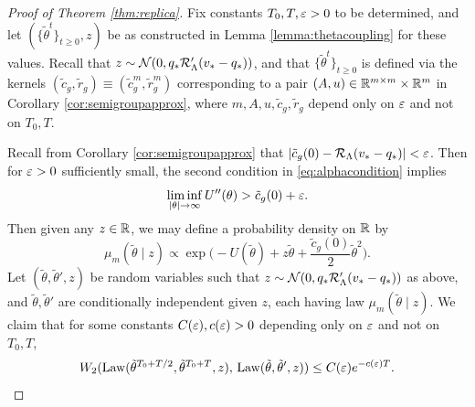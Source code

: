 \begin{proof}[Proof of Theorem \ref{thm:replica}]


Fix constants $T_0,T,\varepsilon>0$ to be determined, and let
$(\{\tilde \theta^t\}_{t \geq 0},z)$
be as constructed in Lemma \ref{lemma:thetacoupling} for these values.
Recall that $z \sim \mathcal{N}(0,q_*\mathcal{R}_\Lambda'(v_*-q_*))$, and that
 $\{\tilde \theta^t\}_{t \geq 0}$ is defined via the kernels
$(\tilde c_g,\tilde r_g) \equiv (\tilde c_g^m,\tilde r_g^m)$
corresponding to a pair $(A,u) \in \mathbb{R}^{m \times m} \times
\mathbb{R}^m$ in Corollary \ref{cor:semigroupapprox},
where $m,A,u,\tilde c_g,\tilde r_g$ depend only on $\varepsilon$ and not on $T_0,T$.

Recall from Corollary \ref{cor:semigroupapprox} that
$|\tilde c_g(0)-\mathcal{R}_\Lambda(v_*-q_*)|<\varepsilon$.
Then for $\varepsilon>0$ sufficiently small, the second condition in
\eqref{eq:alphacondition} implies
\begin{equation}\label{eq:Uconvexityreplica}
\liminf_{|\theta| \to \infty} U''(\theta)>\tilde c_g(0)+\varepsilon.
\end{equation}
Then given any $z \in \mathbb{R}$, we may define a probability density on $\mathbb{R}$ by
\begin{equation}\label{eq:mum}
\mu_m(\tilde \theta \mid z) \propto \exp\bigg({-}U(\tilde\theta)
+z\tilde\theta+\frac{\tilde c_g(0)}{2}\tilde\theta^2\bigg).
\end{equation}
Let $(\tilde\theta,\tilde\theta',z)$ be random variables such that
$z \sim \mathcal{N}(0,q_*\mathcal{R}_\Lambda'(v_*-q_*))$ as above, and
$\tilde\theta,\tilde\theta'$ are conditionally independent given $z$, each
having law $\mu_m(\tilde\theta \mid z)$. We claim that for some constants
$C(\varepsilon),c(\varepsilon)>0$ depending only on $\varepsilon$ and not on $T_0,T$,
\begin{equation}\label{eq:W2tildethetabound}
W_2(\operatorname{Law}(\tilde \theta^{T_0+T/2},\tilde \theta^{T_0+T},z),\,
\operatorname{Law}(\tilde\theta,\tilde\theta',z)) \leq C(\varepsilon)e^{-c(\varepsilon)T}.
\end{equation}


\end{proof}
